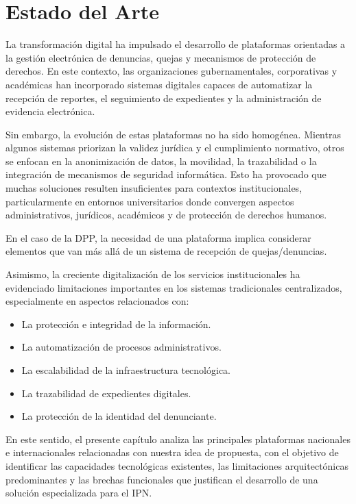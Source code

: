 
\chapter{Estado del Arte}
\label{cap:estado_arte}
\justifying

\begin{flushleft}
\justifying

La transformación digital ha impulsado el desarrollo de plataformas orientadas a la gestión electrónica de denuncias, quejas y mecanismos de protección de derechos. En este contexto, las organizaciones gubernamentales, corporativas y académicas han incorporado sistemas digitales capaces de automatizar la recepción de reportes, el seguimiento de expedientes y la administración de evidencia electrónica.

Sin embargo, la evolución de estas plataformas no ha sido homogénea. Mientras algunos sistemas priorizan la validez jurídica y el cumplimiento normativo, otros se enfocan en la anonimización de datos, la movilidad, la trazabilidad o la integración de mecanismos de seguridad informática. Esto ha provocado que muchas soluciones resulten insuficientes para contextos institucionales, particularmente en entornos universitarios donde convergen aspectos administrativos, jurídicos, académicos y de protección de derechos humanos.

En el caso de la DPP, la necesidad de una plataforma implica considerar elementos que van más allá de un sistema de recepción de quejas/denuncias.

Asimismo, la creciente digitalización de los servicios institucionales ha evidenciado limitaciones importantes en los sistemas tradicionales centralizados, especialmente en aspectos relacionados con:

\begin{itemize}
    \item La protección e integridad de la información.
    \item La automatización de procesos administrativos.
    \item La escalabilidad de la infraestructura tecnológica.
    \item La trazabilidad de expedientes digitales.
    \item La protección de la identidad del denunciante.
\end{itemize}

En este sentido, el presente capítulo analiza las principales plataformas nacionales e internacionales relacionadas con nuestra idea de propuesta, con el objetivo de identificar las capacidades tecnológicas existentes, las limitaciones arquitectónicas predominantes y las brechas funcionales que justifican el desarrollo de una solución especializada para el IPN.

\end{flushleft}

